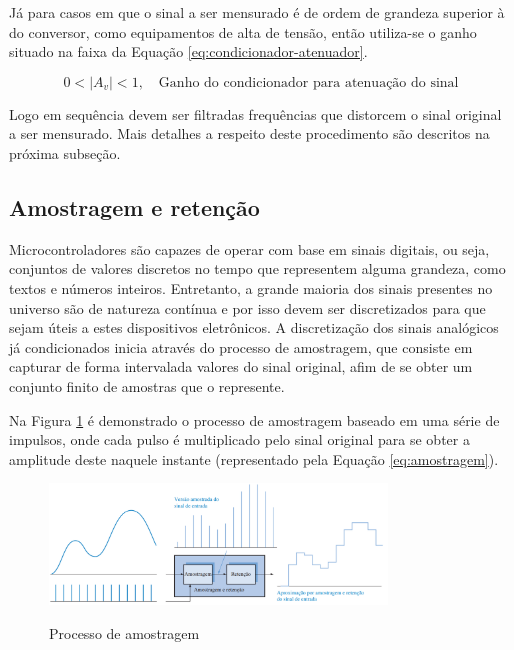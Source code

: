 \documentclass[oneside,openright,12pt]{ufsm_2015} %
\begin{document}
Já para casos em que o sinal a ser mensurado é de ordem de grandeza superior à do conversor, como equipamentos de alta de tensão, então utiliza-se o ganho situado na faixa da Equação \ref{eq:condicionador-atenuador}.

\begin{equation}\label{eq:condicionador-atenuador}
    0 < |A_{v}| < 1,\quad \text{Ganho do condicionador para atenuação do sinal}    
\end{equation}

Logo em sequência devem ser filtradas frequências que distorcem o sinal original a ser mensurado. Mais detalhes a respeito deste procedimento são descritos na próxima subseção.

\subsection{Amostragem e retenção}
Microcontroladores são capazes de operar com base em sinais digitais, ou seja, conjuntos de valores discretos no tempo que representem alguma grandeza, como textos e números inteiros. Entretanto, a grande maioria dos sinais presentes no universo são de natureza contínua e por isso devem ser discretizados para que sejam úteis a estes dispositivos eletrônicos. A discretização dos sinais analógicos já condicionados inicia através do processo de amostragem, que consiste em capturar de forma intervalada valores do sinal original, afim de se obter um conjunto finito de amostras que o represente.

Na Figura \ref{fig:processo-de-amostragem} é demonstrado o processo de amostragem baseado em uma série de impulsos, onde cada pulso é multiplicado pelo sinal original para se obter a amplitude deste naquele instante (representado pela Equação \ref{eq:amostragem}). 

\begin{figure}[ht]
    \caption{\label{exepretex} Processo de amostragem}
    \centering
    \includegraphics[width=0.8\textwidth]{figuras/sample-and-hold.png}
    \vspace{\baselineskip} %
        \label{fig:processo-de-amostragem}
\end{figure}
\end{document}
